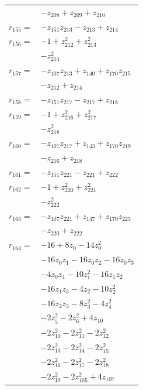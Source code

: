 \begin{longtable}{@{}r@{\;}l@{}}
 & \(\displaystyle -z_{208} +z_{209} +z_{210}\) \\[3pt]
\(r_{155}=\) & \(\displaystyle -z_{151}z_{213} -z_{213} +z_{214}\) \\[3pt]
\(r_{156}=\) & \(\displaystyle -1 +z_{212}^{2} +z_{213}^{2}\) \\
 & \(\displaystyle -z_{214}^{2}\) \\[3pt]
\(r_{157}=\) & \(\displaystyle -z_{107}z_{213} +z_{140} +z_{170}z_{215}\) \\
 & \(\displaystyle -z_{212} +z_{214}\) \\[3pt]
\(r_{158}=\) & \(\displaystyle -z_{151}z_{217} -z_{217} +z_{218}\) \\[3pt]
\(r_{159}=\) & \(\displaystyle -1 +z_{216}^{2} +z_{217}^{2}\) \\
 & \(\displaystyle -z_{218}^{2}\) \\[3pt]
\(r_{160}=\) & \(\displaystyle -z_{107}z_{217} +z_{143} +z_{170}z_{219}\) \\
 & \(\displaystyle -z_{216} +z_{218}\) \\[3pt]
\(r_{161}=\) & \(\displaystyle -z_{151}z_{221} -z_{221} +z_{222}\) \\[3pt]
\(r_{162}=\) & \(\displaystyle -1 +z_{220}^{2} +z_{221}^{2}\) \\
 & \(\displaystyle -z_{222}^{2}\) \\[3pt]
\(r_{163}=\) & \(\displaystyle -z_{107}z_{221} +z_{147} +z_{170}z_{223}\) \\
 & \(\displaystyle -z_{220} +z_{222}\) \\[3pt]
\(r_{164}=\) & \(\displaystyle -16 +8z_{0} -14z_{0}^{2}\) \\
 & \(\displaystyle -16z_{0}z_{1} -16z_{0}z_{2} -16z_{0}z_{3}\) \\
 & \(\displaystyle -4z_{0}z_{4} -10z_{1}^{2} -16z_{1}z_{2}\) \\
 & \(\displaystyle -16z_{1}z_{3} -4z_{2} -10z_{2}^{2}\) \\
 & \(\displaystyle -16z_{2}z_{3} -8z_{3}^{2} -4z_{4}^{2}\) \\
 & \(\displaystyle -2z_{5}^{2} -2z_{6}^{2} +4z_{10}\) \\
 & \(\displaystyle -2z_{10}^{2} -2z_{11}^{2} -2z_{12}^{2}\) \\
 & \(\displaystyle -2z_{13}^{2} -2z_{14}^{2} -2z_{15}^{2}\) \\
 & \(\displaystyle -2z_{16}^{2} -2z_{17}^{2} -2z_{18}^{2}\) \\
 & \(\displaystyle -2z_{19}^{2} -2z_{105}^{2} +4z_{107}\) \\

\end{longtable}
